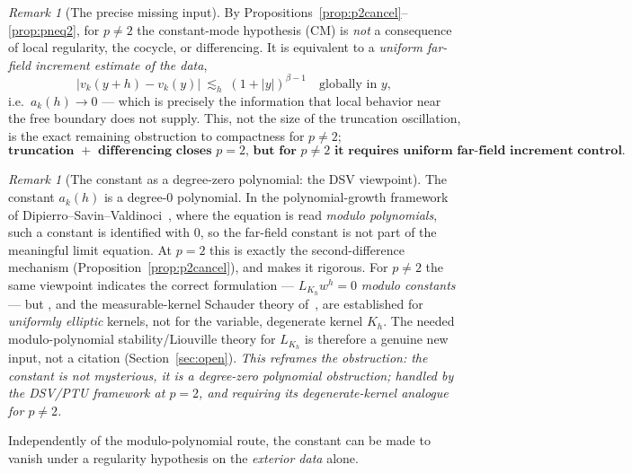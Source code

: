 \documentclass[11pt]{amsart}
\theoremstyle{plain}
\theoremstyle{definition}
\theoremstyle{remark}
\newtheorem{remark}[theorem]{Remark}
\begin{document}
\begin{remark}[The precise missing input]\label{rem:farfield}
By Propositions~\ref{prop:p2cancel}--\ref{prop:pneq2}, for $p\neq2$ the
constant-mode hypothesis \textnormal{(CM)} is \emph{not} a consequence of local
regularity, the cocycle, or differencing. It is equivalent to a
\emph{uniform far-field increment estimate of the data},
\[
  |v_k(y+h)-v_k(y)|\ \lesssim_h\ (1+|y|)^{\beta-1}\quad\text{globally in }y,
\]
i.e.\ $a_k(h)\to0$ --- which is precisely the information that local behavior
near the free boundary does not supply. This, not the size of the truncation
oscillation, is the exact remaining obstruction to compactness for $p\neq2$;
\[
  \textbf{truncation }+\textbf{ differencing closes }p=2\textbf{, but for }
  p\neq2\textbf{ it requires uniform far-field increment control.}
\]
\end{remark}

\begin{remark}[The constant as a degree-zero polynomial: the DSV viewpoint]\label{rem:dsv}
The constant $a_k(h)$ is a degree-$0$ polynomial. In the polynomial-growth
framework of Dipierro--Savin--Valdinoci~\cite{DSV}, where the equation is read
\emph{modulo polynomials}, such a constant is identified with $0$, so the
far-field constant is not part of the meaningful limit equation. At $p=2$ this
is exactly the second-difference mechanism (Proposition~\ref{prop:p2cancel}),
and \cite{DSV} makes it rigorous. For $p\neq2$ the same viewpoint indicates the
correct formulation --- $L_{K_h}w^h=0$ \emph{modulo constants} --- but
\cite{DSV}, and the measurable-kernel Schauder theory of~\cite{FRO,Serra}, are
established for \emph{uniformly elliptic} kernels, not for the variable,
degenerate kernel $K_h$. The needed modulo-polynomial stability/Liouville
theory for $L_{K_h}$ is therefore a genuine new input, not a citation
(Section~\ref{sec:open}). \emph{This reframes the obstruction: the constant is
not mysterious, it is a degree-zero polynomial obstruction; handled by the
\textnormal{DSV/PTU} framework at $p=2$, and requiring its degenerate-kernel
analogue for $p\neq2$.}
\end{remark}

Independently of the modulo-polynomial route, the constant can be made to
vanish under a regularity hypothesis on the \emph{exterior data} alone.
\end{document}
